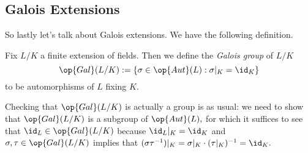 \documentclass[../notes.tex]{subfiles}
\begin{document}
\subsection{Galois Extensions}
So lastly let's talk about Galois extensions. We have the following definition.
\begin{defi}
	Fix $L/K$ a finite extension of fields. Then we define the \textit{Galois group} of $L/K$
	\[\op{Gal}(L/K):=\{\sigma\in\op{Aut}(L):\sigma|_K=\id_K\}\]
	to be automorphisms of $L$ fixing $K.$
\end{defi}
Checking that $\op{Gal}(L/K)$ is actually a group is as usual: we need to show that $\op{Gal}(L/K)$ is a subgroup of $\op{Aut}(L),$ for which it suffices to see that $\id_L\in\op{Gal}(L/K)$ because $\id_L|_K=\id_K$ and $\sigma,\tau\in\op{Gal}(L/K)$ implies that $(\sigma\tau^{-1})|_K=\sigma|_K\cdot(\tau|_K)^{-1}=\id_K.$
\end{document}
